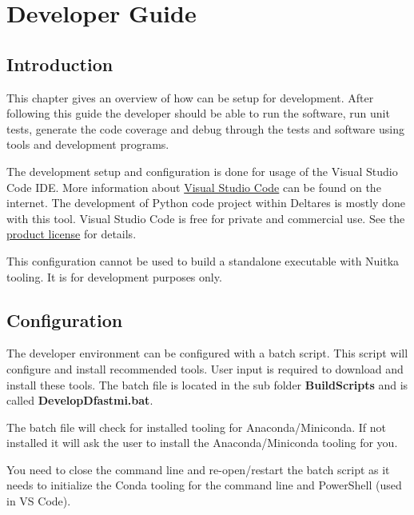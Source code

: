 \chapter{Developer Guide}\label{Chp:DevGuides}

\section{Introduction}

This chapter gives an overview of how \dfastmi can be setup for development.
After following this guide the developer should be able to run the software, run unit tests, generate the code coverage and debug through the tests and software using tools and development programs.

The development setup and configuration is done for usage of the Visual Studio Code IDE.
More information about \href{https://code.visualstudio.com/}{Visual Studio Code} can be found on the internet.
The development of Python code project within Deltares is mostly done with this tool.
Visual Studio Code is free for private and commercial use.
See the \href{https://code.visualstudio.com/license}{product license} for details.

\begin{Remark}
	\item This configuration cannot be used to build a standalone executable with Nuitka tooling.
	It is for development purposes only.
\end{Remark}

\section{Configuration}
The \dfastmi developer environment can be configured with a batch script.
This script will configure and install recommended tools.
User input is required to download and install these tools.
The batch file is located in the sub folder \textbf{BuildScripts} and is called \textbf{DevelopDfastmi.bat}.

The batch file will check for installed tooling for Anaconda/Miniconda.
If not installed it will ask the user to install the Anaconda/Miniconda tooling for you. 

\begin{Note}
You need to close the command line and re-open/restart the batch script as it needs to initialize the Conda tooling for the command line and PowerShell (used in VS Code).
\end{Note}

